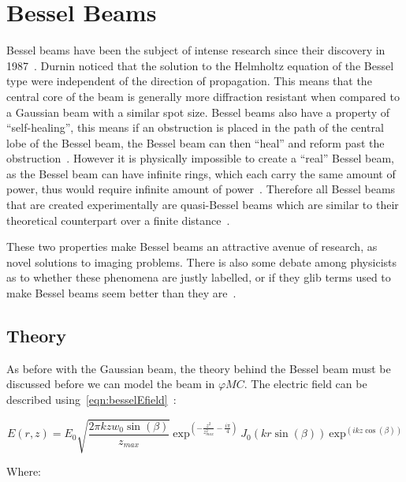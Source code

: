 \section{Bessel Beams}

Bessel beams have been the subject of intense research since their discovery in 1987~\cite{durnin1987diffraction,durnin1987exact}. 
Durnin noticed that the solution to the Helmholtz equation of the Bessel type were independent of the direction of propagation.
This means that the central core of the beam is generally more diffraction resistant when compared to a Gaussian beam with a similar spot size.
Bessel beams also have a property of ``self-healing'', this means if an obstruction is placed in the path of the central lobe of the Bessel beam, the Bessel beam can then ``heal'' and reform past the obstruction~\cite{mcgloin2005bessel}.
However it is physically impossible to create a ``real'' Bessel beam, as the Bessel beam can have infinite rings, which each carry the same amount of power, thus would require infinite amount of power~\cite{durnin1987diffraction}.
Therefore all Bessel beams that are created experimentally are quasi-Bessel beams which are similar to their theoretical counterpart over a finite distance~\cite{durnin1987diffraction}.


These two properties make Bessel beams an attractive avenue of research, as novel solutions to imaging problems.
There is also some debate among physicists as to whether these phenomena are justly labelled, or if they glib terms used to make Bessel beams seem better than they are~\cite{debeer1987comment,harvey1984spot,durnin1987reply,sprangle1991comment,durnin1991durnin}.

\subsection{Theory}
As before with the Gaussian beam, the theory behind the Bessel beam must be discussed before we can model the beam in $\varphi MC$.
The electric field can be described using~\cref{eqn:besselEfield}~\cite{vcivzmar2006opticke}:

\begin{equation}
    E(r,z)=E_0\sqrt{\frac{2\pi k z w_0\sin(\beta)}{z_{max}}}\ \text{exp}^{\left(-\frac{z^2}{z_{max}^2}-\frac{i\pi}{4}\right)}\ J_0\left(kr\sin(\beta)\right)\ \text{exp}^{\left(ikz\cos(\beta)\right)}
    \label{eqn:besselEfield}
\end{equation}

\noindent Where:

